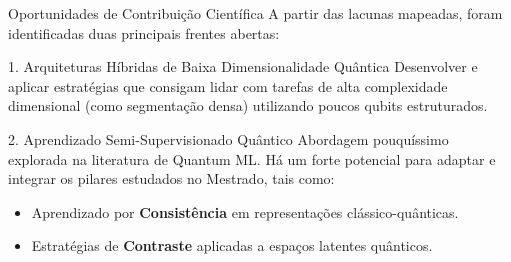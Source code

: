 \documentclass[aspectratio=169, 11pt]{beamer}
\begin{document}
\begin{frame}{Oportunidades de Contribuição Científica}
    A partir das lacunas mapeadas, foram identificadas duas principais frentes abertas:
    
    \vspace{0.2cm}
    \begin{block}{1. Arquiteturas Híbridas de Baixa Dimensionalidade Quântica}
        Desenvolver e aplicar estratégias que consigam lidar com tarefas de alta complexidade dimensional (como segmentação densa) utilizando poucos qubits estruturados.
    \end{block}
    
    \begin{block}{2. Aprendizado Semi-Supervisionado Quântico}
        Abordagem pouquíssimo explorada na literatura de Quantum ML. Há um forte potencial para adaptar e integrar os pilares estudados no Mestrado, tais como:
        \begin{itemize}
            \item Aprendizado por \textbf{Consistência} em representações clássico-quânticas.
            \item Estratégias de \textbf{Contraste} aplicadas a espaços latentes quânticos.
        \end{itemize}
    \end{block}
\end{frame}





\end{document}
